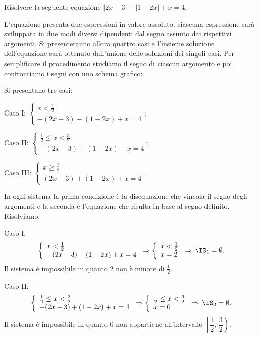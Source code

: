 \begin{exrig}
\begin{esempio}
Risolvere la seguente equazione $\left|2x-3\right|-\left|1-2x\right|+x=4$.

L'equazione presenta due espressioni in valore assoluto; ciascuna espressione sarà sviluppata in due modi diversi dipendenti dal segno assunto dai rispettivi argomenti. Si presenteranno allora quattro casi e l'insieme soluzione dell'equazione sarà ottenuto dall'unione delle soluzioni dei singoli casi. Per semplificare il procedimento studiamo il segno di ciascun argomento e poi confrontiamo i segni con uno schema grafico:
\begin{center}

\end{center}
Si presentano tre casi:
\begin{itemize*}
\item Caso I: $ \left\{\begin{array}{l}{x< \frac 1 2}\\{-(2x-3)-(1-2x)+x=4}\end{array}\right. $;
\item Caso II: $ \left\{\begin{array}{l}{\frac 1 2\le x<\frac 3 2}\\{-(2x-3)+(1-2x)+x=4}\end{array}\right. $;
\item Caso III: $ \left\{\begin{array}{l}{x\ge \frac 3 2}\\{(2x-3)+(1-2x)+x=4}\end{array}\right. $.
\end{itemize*}
In ogni sistema la prima condizione è la disequazione che vincola il segno degli argomenti e la seconda è l'equazione che risulta in base al segno definito. Risolviamo.

Caso I:
\[\left\{\begin{array}{l}x< \frac 1 2\\-(2x-3)-(1-2x)+x=4\end{array}\right.\Rightarrow \left\{\begin{array}{l}x< \frac 1 2\\x=2\end{array}\right.\Rightarrow\: \IS_1=\emptyset .\]
Il sistema è impossibile in quanto $2$ non è minore di $\frac 1 2$.

Caso II: 
\[\left\{\begin{array}{l}\frac 1 2\le x< \frac 3 2\\-(2x-3)+(1-2x)+x=4\end{array}\right.\Rightarrow \left\{\begin{array}{l}\frac 1 2\le x< \frac 3 2\\x=0\end{array}\right.\Rightarrow\: \IS_2=\emptyset .\]
Il sistema è impossibile in quanto 0 non appartiene all'intervallo $\left[\dfrac{1}{2}\text{, }\dfrac{3}{2}\right)$.


\end{esempio}
\end{exrig}
